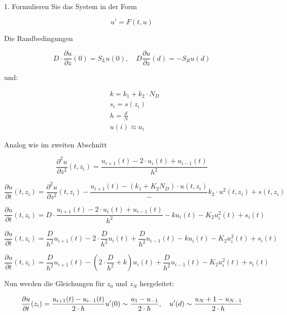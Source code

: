 1. Formulieren Sie das System in der Form

\begin{equation*}
	u' = F(t,u)
\end{equation*}

Die Randbedingungen

\begin{equation}
	D\cdot \frac{\partial u}{\partial z}(0)=S_Lu(0),\quad D\frac{\partial u}{\partial z}(d)=-S_Ru(d)
\end{equation}

und:

\begin{align*}
	&k=k_1+k_2\cdot N_D\\
	&s_i=s(z_i)\\
	&h=\frac{d}{N}\\
	&u(i)\approx u_i
\end{align*}

Analog wie im zweiten Abschnitt

\begin{equation}
	\frac{\partial^2 u}{\partial z^2}(t,z_i) = \frac{u_{i+1}(t) - 2\cdot u_i(t) + u_{i-1}(t)}{h^2}
\end{equation}

\begin{equation}
	\frac{\partial u}{\partial t}(t,z_i) =\frac{\partial^2 u}{\partial z^2}(t,z_i)- \frac{u_{i+1}(t) - (k_1 + K_2N_D)\cdot u(t,z_i)} - k_2\cdot u^2(t,z_i) + s(t,z_i)
\end{equation}
	
	\begin{equation}
		\frac{\partial u}{\partial t}(t,z_i) = D\cdot \frac{u_{i+1}(t) - 2\cdot u_i(t) + u_{i-1}(t)}{h^2} - ku_i(t) - K_2u^2_i(t) + s_i(t)
	\end{equation}
	
	\begin{equation}
		\frac{\partial u}{\partial t}(t,z_i) = 	\frac{D}{h^2}u_{i+1}(t) - 2\cdot \frac{D}{h^2}u_i(t) + \frac{D}{h^2}u_{i-1}(t) - ku_i(t) - K_2u^2_i(t) + s_i(t)
	\end{equation}
	
	\begin{equation}
		\frac{\partial u}{\partial t}(t,z_i) = 	\frac{D}{h^2}u_{i+1}(t) - (2\cdot \frac{D}{h^2} + k)u_i(t) + \frac{D}{h^2}u_{i-1}(t) - K_2u^2_i(t) + s_i(t)
	\end{equation}
	
	
	Nun werden die Gleichungen für $z_0$ und $z_N$ hergeleitet:
	
	\begin{equation}
		\frac{\partial u}{\partial t}(z_i) = \frac{u_{i+1}(t) - u_{i-1}(t)}{2\cdot h}\\
		u'(0) \sim \frac{u_1-u_{-1}}{2\cdot h}, \quad u'(d) \sim \frac{u_N+1-u_{N-1}}{2\cdot h}
	\end{equation}